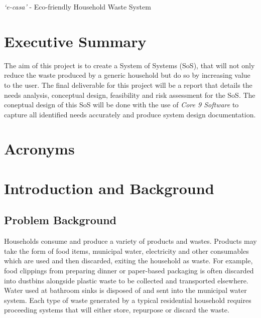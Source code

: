 \documentclass[a4paper,11pt,fleqn]{report}
\begin{document}

\textit{`e-casa'} - Eco-friendly Household Waste System

\chapter*{Executive Summary}
The aim of this project is to create a System of Systems (SoS), that will not only reduce the waste produced by a generic household but do so by increasing value to the user. The final deliverable for this project will be a report that details the needs analysis, conceptual design, feasibility and risk assessment for the SoS. The coneptual design of this SoS will be done with the use of \textit{Core 9 Software} to capture all identified needs accurately and produce system design documentation.

\tableofcontents
\listoffigures{}
\listoftables{}

\chapter*{Acronyms}
\begin{acronym}[ABCDEF]
\end{acronym}

\chapter{Introduction and Background}
\setcounter{page}{1}
\acresetall

\section{Problem Background} \label{sec: Problem Background}
 Households consume and produce a variety of products and wastes. Products may take the form of food items, municipal water, electricity and other consumables which are used and then discarded, exiting the household as waste. For example, food clippings from preparing dinner or paper-based packaging is often discarded into dustbins alongside plastic waste to be collected and transported elsewhere. Water used at bathroom sinks is disposed of and sent into the municipal water system. Each type of waste generated by a typical residential household requires proceeding systems that will either store, repurpose or discard the waste.
  
\end{document}

